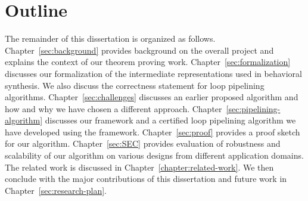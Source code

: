 \section {Outline}
The remainder of this dissertation is organized as
follows. Chapter~\ref{sec:background} provides background on the overall project and 
explains the context of our theorem proving work. Chapter~\ref{sec:formalization} 
discusses our formalization of the intermediate representations used in behavioral synthesis.
We also discuss the correctness statement for loop pipelining algorithms. Chapter~\ref{sec:challenges} 
discusses an earlier proposed algorithm and how and why we have chosen a different approach.
Chapter~\ref{sec:pipelining-algorithm} discusses our framework and a certified loop pipelining 
algorithm we have developed using the framework. Chapter~\ref{sec:proof} provides a proof 
sketch for our algorithm. Chapter~\ref{sec:SEC} provides evaluation of robustness and 
scalability of our algorithm on various designs from different application domains. The related work is discussed in Chapter~\ref{chapter:related-work}.
We then conclude with the major 
contributions of this dissertation and future work in Chapter~\ref{sec:research-plan}.
